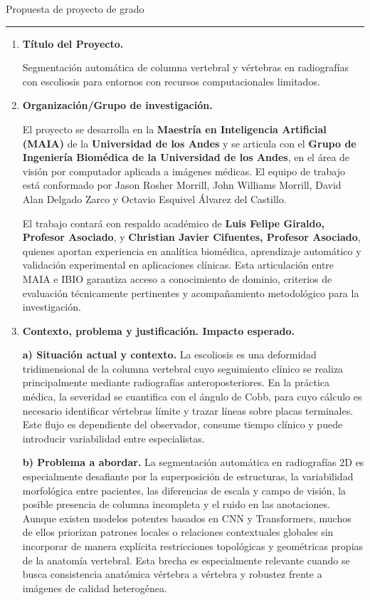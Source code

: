 \documentclass[8pt,a4paper]{article}
\newcommand{\FormatoTitulo}[1]{%
    \begin{center}
        \vspace*{-0.4cm}
        {\fontsize{22}{24}\selectfont #1\par}
        \vspace{0.25cm}
        {\color[rgb]{0.35,0.23,0.95}\rule{8.2cm}{1.4pt}}
    \end{center}
    \vspace{0.8cm}
}
\newcommand{\Subtitulo}[1]{\vspace{0.15cm}\textbf{#1}}
\begin{document}
\FormatoTitulo{Propuesta de proyecto de grado}

\begin{enumerate}[leftmargin=0.8cm,label=\arabic*.,itemsep=0.85em]

    \item \textbf{Título del Proyecto.}

    Segmentación automática de columna vertebral y vértebras en radiografías con escoliosis para entornos con recursos computacionales limitados.

    \item \textbf{Organización/Grupo de investigación.}

    El proyecto se desarrolla en la \textbf{Maestría en Inteligencia Artificial (MAIA)} de la \textbf{Universidad de los Andes} y se articula con el \textbf{Grupo de Ingeniería Biomédica de la Universidad de los Andes}, en el área de visión por computador aplicada a imágenes médicas. El equipo de trabajo está conformado por Jason Rosher Morrill, John Williams Morrill, David Alan Delgado Zarco y Octavio Esquivel Álvarez del Castillo.

    El trabajo contará con respaldo académico de \textbf{Luis Felipe Giraldo, Profesor Asociado}, y \textbf{Christian Javier Cifuentes, Profesor Asociado}, quienes aportan experiencia en analítica biomédica, aprendizaje automático y validación experimental en aplicaciones clínicas. Esta articulación entre MAIA e IBIO garantiza acceso a conocimiento de dominio, criterios de evaluación técnicamente pertinentes y acompañamiento metodológico para la investigación.

    \item \textbf{Contexto, problema y justificación. Impacto esperado.}

    \Subtitulo{a) Situación actual y contexto.} La escoliosis es una deformidad tridimensional de la columna vertebral cuyo seguimiento clínico se realiza principalmente mediante radiografías anteroposteriores. En la práctica médica, la severidad se cuantifica con el ángulo de Cobb, para cuyo cálculo es necesario identificar vértebras límite y trazar líneas sobre placas terminales. Este flujo es dependiente del observador, consume tiempo clínico y puede introducir variabilidad entre especialistas.

    \Subtitulo{b) Problema a abordar.} La segmentación automática en radiografías 2D es especialmente desafiante por la superposición de estructuras, la variabilidad morfológica entre pacientes, las diferencias de escala y campo de visión, la posible presencia de columna incompleta y el ruido en las anotaciones. Aunque existen modelos potentes basados en CNN y Transformers, muchos de ellos priorizan patrones locales o relaciones contextuales globales sin incorporar de manera explícita restricciones topológicas y geométricas propias de la anatomía vertebral. Esta brecha es especialmente relevante cuando se busca consistencia anatómica vértebra a vértebra y robustez frente a imágenes de calidad heterogénea.


\end{enumerate}
\end{document}
